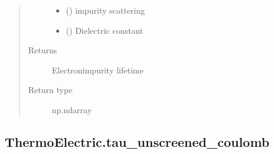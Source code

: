 \documentclass[letterpaper,10pt,english]{sphinxmanual}
\begin{document}
\begin{fulllineitems}
\begin{quote}
\begin{description}
\begin{itemize}
\item {} 
\sphinxAtStartPar
{} () \textendash{} impurity scattering

\item {} 
\sphinxAtStartPar
{} () \textendash{} Dielectric constant

\end{itemize}

\item[{Returns}] \leavevmode
\sphinxAtStartPar
{} \textendash{} Electron\sphinxhyphen{}impurity lifetime

\item[{Return type}] \leavevmode
\sphinxAtStartPar
np.ndarray

\end{description}\end{quote}

\end{fulllineitems}



\subsection{ThermoElectric.tau\_unscreened\_coulomb}
\label{\detokenize{autosummary/ThermoElectric.tau_unscreened_coulomb:thermoelectric-tau-unscreened-coulomb}}\label{\detokenize{autosummary/ThermoElectric.tau_unscreened_coulomb::doc}}
\end{document}
